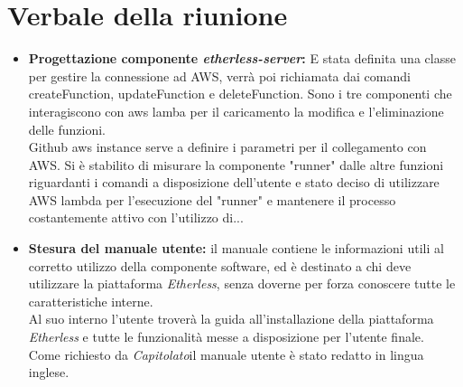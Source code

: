 \section{Verbale della riunione}
	\begin{itemize}
		\item \textbf{Progettazione componente \textit{etherless-server}:} 
		E stata definita una classe per gestire la connessione ad AWS, verrà poi richiamata dai comandi createFunction, updateFunction e deleteFunction. Sono i tre componenti che interagiscono con aws lamba per il caricamento la modifica e l'eliminazione delle funzioni.\\
		Github aws instance serve a definire i parametri per il collegamento con AWS.
		Si è stabilito di misurare la componente "runner" dalle altre funzioni riguardanti i comandi a disposizione dell'utente
		e stato deciso di utilizzare AWS lambda per l'esecuzione del "runner" e mantenere il processo costantemente attivo con l'utilizzo di...
		
		\item \textbf{Stesura del manuale utente:} 
		il manuale contiene le informazioni utili al corretto utilizzo della componente software, ed è destinato a chi deve utilizzare la piattaforma \textit{Etherless}, senza doverne per forza conoscere tutte le caratteristiche interne.\\
		Al suo interno l'utente troverà la guida all'installazione della piattaforma \textit{Etherless} e tutte le funzionalità messe a disposizione per l'utente finale.\\
		Come richiesto da \textit{Capitolato}\glo il manuale utente è stato redatto in lingua inglese.
		
	\end{itemize}